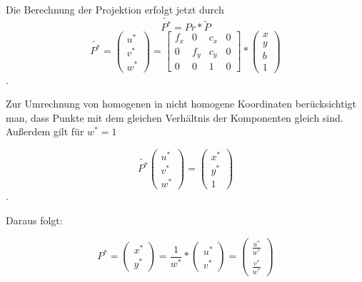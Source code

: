 Die Berechnung der Projektion erfolgt jetzt durch \begin{equation}
  \tilde{P^*}=Pr*\tilde{P} \end{equation} \begin{equation} \tilde{P^*}=
  \begin{pmatrix} u^*\\v^*\\w^* \end{pmatrix} = \begin{bmatrix} f_x&0&c_x&0\\
    0&f_y&c_y&0\\ 0&0&1&0 \end{bmatrix} * \begin{pmatrix} x\\y\\b\\1
  \end{pmatrix} \end{equation}. \cite{Bradski2008}



Zur Umrechnung von homogenen in nicht homogene Koordinaten berücksichtigt man,
dass Punkte mit dem gleichen Verhältnis der Komponenten gleich sind. Außerdem
gilt für $w^*=1$

\begin{equation}
  \tilde{P^*}
  \begin{pmatrix}
    u^*\\v^*\\w^* \end{pmatrix} = \begin{pmatrix} x^*\\y^*\\1 \end{pmatrix}
\end{equation}.

Daraus folgt:

\begin{equation} P^*= \begin{pmatrix} x^*\\ y^* \end{pmatrix} = \frac{1}{w^*}*
  \begin{pmatrix} u^*\\ v^* \end{pmatrix} = \begin{pmatrix} \frac{u^*}{w^*}\\
    \frac{v^*}{w^*} \end{pmatrix} \end{equation}

